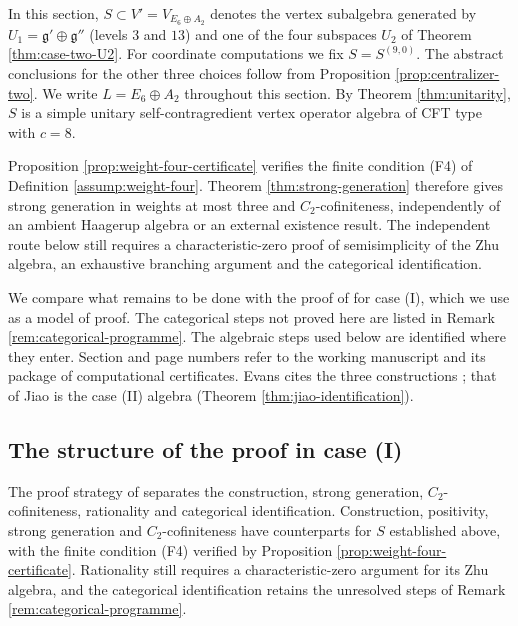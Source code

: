 \documentclass[leqno]{article}
\numberwithin{equation}{section}
\begin{document}
In this section, $S \subset V' = V_{E_6 \oplus A_2}$ denotes the vertex subalgebra generated by $U_1 = \mathfrak g' \oplus \mathfrak g''$ (levels $3$ and $13$) and one of the four subspaces $U_2$ of Theorem \ref{thm:case-two-U2}. For coordinate computations we fix $S = S^{(9,0)}$. The abstract conclusions for the other three choices follow from Proposition \ref{prop:centralizer-two}. We write $L = E_6 \oplus A_2$ throughout this section. By Theorem \ref{thm:unitarity}, $S$ is a simple unitary self-contragredient vertex operator algebra of CFT type with $c = 8$.

Proposition \ref{prop:weight-four-certificate} verifies the finite condition \textup{(F4)} of Definition \ref{assump:weight-four}. Theorem \ref{thm:strong-generation} therefore gives strong generation in weights at most three and $C_2$-cofiniteness, independently of an ambient Haagerup algebra or an external existence result. The independent route below still requires a characteristic-zero proof of semisimplicity of the Zhu algebra, an exhaustive branching argument and the categorical identification.

We compare what remains to be done with the proof of \cite{Rie26b} for case (I), which we use as a model of proof. The categorical steps not proved here are listed in Remark \ref{rem:categorical-programme}. The algebraic steps used below are identified where they enter. Section and page numbers refer to the working manuscript \cite{Rie26b} and its package of computational certificates. Evans \cite[p.~3]{Eva26} cites the three constructions \cite{Hua26,Jia26,Rie26}; that of Jiao is the case (II) algebra (Theorem \ref{thm:jiao-identification}).

\subsection{The structure of the proof in case (I)}
\label{subsec:riesen-structure}

The proof strategy of \cite{Rie26b} separates the construction, strong generation, $C_2$-cofiniteness, rationality and categorical identification. Construction, positivity, strong generation and $C_2$-cofiniteness have counterparts for $S$ established above, with the finite condition \textup{(F4)} verified by Proposition \ref{prop:weight-four-certificate}. Rationality still requires a characteristic-zero argument for its Zhu algebra, and the categorical identification retains the unresolved steps of Remark \ref{rem:categorical-programme}.
\end{document}
